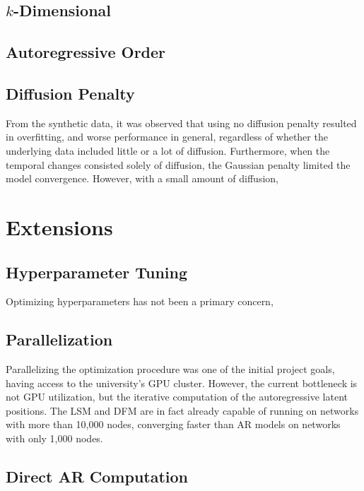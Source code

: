     \subsection{\texorpdfstring{$k$}{k}-Dimensional}
    
    \subsection{Autoregressive Order}
    
    \subsection{Diffusion Penalty}
    
        From the synthetic data, it was observed that using no diffusion penalty resulted in overfitting, and worse performance in general, regardless of whether the underlying data included little or a lot of diffusion. Furthermore, when the temporal changes consisted solely of diffusion, the Gaussian penalty limited the model convergence. However, with a small amount of diffusion, 
    
\section{Extensions}
    
    \subsection{Hyperparameter Tuning}
    
        Optimizing hyperparameters has not been a primary concern, 
    
    \subsection{Parallelization}
    
        Parallelizing the optimization procedure was one of the initial project goals, having access to the university's GPU cluster.
        However, the current bottleneck is not GPU utilization, but the iterative computation of the autoregressive latent positions. The LSM and DFM are in fact already capable of running on networks with more than 10,000 nodes, converging faster than AR models on networks with only 1,000 nodes.

    \subsection{Direct AR Computation}
    
